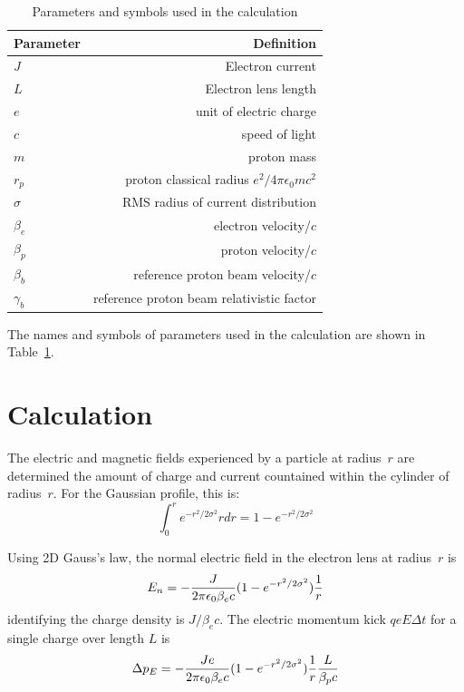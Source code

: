 \documentclass[acus]{jacow}
\begin{document}
\begin{table}[!hbt]
   \centering
   \caption{Parameters and symbols used in the calculation}
   \begin{tabular}{lr}
       \toprule
       \textbf{Parameter} & \textbf{Definition} \\
       \midrule
       $J$       & Electron current \\
       $L$       & Electron lens length  \\
       $e$       & unit of electric charge \\
       $c$       & speed of light \\
       $m$       & proton mass \\
       $r_p$     & proton classical radius $e^2/4 \pi \epsilon_0 m c^2$ \\
       $\sigma$ & RMS radius of current distribution     \\
       $\beta_e$    & electron velocity/$c$   \\
       $\beta_p$  & proton velocity/$c$ \\
       $\beta_b$  & reference proton beam velocity/$c$ \\
       $\gamma_b$ & reference proton beam relativistic factor \\
       \bottomrule
   \end{tabular}
   \label{parameters}
\end{table}
  

The names and symbols of parameters used in the calculation are shown in
Table~\ref{parameters}.

\section{Calculation}

The electric and magnetic fields experienced by a particle at radius~$r$ are
determined the amount of charge and current countained within the cylinder
of radius~$r$.
For the Gaussian profile, this is:
$$
\int_0^{r} e^{-{{r^2} / { 2 \sigma^2}}} r dr = 1 - e^{-{{r^2} / {2 \sigma^2}}}
$$

Using 2D Gauss's law, the normal electric field in the electron lens at radius~$r$ is
$$
E_n = -{ J \over {2 \pi \epsilon_0 \beta_e c}} ( 1 - e^{-{{r^2} / {2 \sigma^2}}} ) {1 \over r}
$$
identifying the charge density is $J / \beta_e c$.
The electric momentum kick $q e E \Delta t$ for a single charge over length $L$ is
$$
\Delta p_E = -{ J e \over {2 \pi \epsilon_0 \beta_e c}} ( 1 - e^{-{{r^2} / {2 \sigma^2}}} )  {1 \over r}{ L \over { \beta_p c }}
$$
\end{document}
